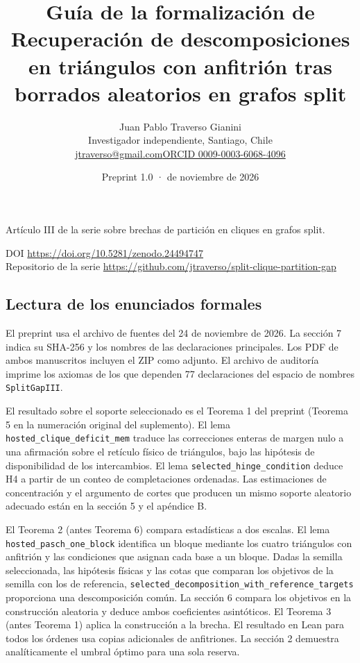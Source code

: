 \documentclass[spanish,11pt,a4paper]{article}
\title{Guía de la formalización de Recuperación de descomposiciones en triángulos con anfitrión tras borrados aleatorios en grafos split}
\author{Juan Pablo Traverso Gianini\\\small Investigador independiente, Santiago, Chile\\\small\href{mailto:jtraverso@gmail.com}{jtraverso@gmail.com}\quad\href{https://orcid.org/0009-0003-6068-4096}{ORCID 0009-0003-6068-4096}}
\date{Preprint 1.0 \enspace·\enspace 24 de noviembre de 2026}
\begin{document}
\raggedbottom\maketitle
\begin{center}Artículo III de la serie sobre brechas de partición en cliques en grafos split.\end{center}
\noindent DOI \url{https://doi.org/10.5281/zenodo.24494747}\\
Repositorio de la serie \url{https://github.com/jtraverso/split-clique-partition-gap}
\subsection{Lectura de los enunciados formales}\label{lectura-de-los-enunciados-formales}

El preprint usa el archivo de fuentes del 24 de noviembre de 2026. La sección 7 indica su SHA-256 y los nombres de las declaraciones principales. Los PDF de ambos manuscritos incluyen el ZIP como adjunto. El archivo de auditoría imprime los axiomas de los que dependen 77 declaraciones del espacio de nombres \texttt{SplitGapIII}.

El resultado sobre el soporte seleccionado es el Teorema 1 del preprint (Teorema 5 en la numeración original del suplemento). El lema \nolinkurl{hosted_clique_deficit_mem} traduce las correcciones enteras de margen nulo a una afirmación sobre el retículo físico de triángulos, bajo las hipótesis de disponibilidad de los intercambios. El lema \nolinkurl{selected_hinge_condition} deduce H4 a partir de un conteo de completaciones ordenadas. Las estimaciones de concentración y el argumento de cortes que producen un mismo soporte aleatorio adecuado están en la sección 5 y el apéndice B.

El Teorema 2 (antes Teorema 6) compara estadísticas a dos escalas. El lema \nolinkurl{hosted_pasch_one_block} identifica un bloque mediante los cuatro triángulos con anfitrión y las condiciones que asignan cada base a un bloque. Dadas la semilla seleccionada, las hipótesis físicas y las cotas que comparan los objetivos de la semilla con los de referencia, \nolinkurl{selected_decomposition_with_reference_targets} proporciona una descomposición común. La sección 6 compara los objetivos en la construcción aleatoria y deduce ambos coeficientes asintóticos. El Teorema 3 (antes Teorema 1) aplica la construcción a la brecha. El resultado en Lean para todos los órdenes usa copias adicionales de anfitriones. La sección 2 demuestra analíticamente el umbral óptimo para una sola reserva.
\end{document}
